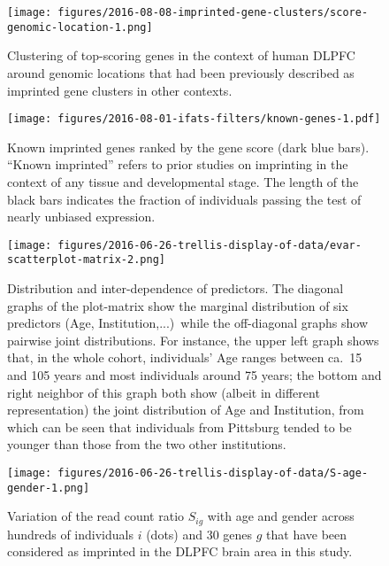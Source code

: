 \documentclass[letterpaper]{article}
\begin{document}

\setcounter{figure}{0}
\makeatletter 
\renewcommand{\thefigure}{S\@arabic\c@figure}
\makeatother

\begin{figure}[h]
\begin{center}
\texttt{[image: figures/2016-08-08-imprinted-gene-clusters/score-genomic-location-1.png]}
\end{center}
\caption{
Clustering of top-scoring genes in the context of human DLPFC around genomic locations that
had been previously described as imprinted gene clusters in other contexts.
}
\label{fig:clusters}
\end{figure}

\begin{figure}[h]
\begin{center}
\texttt{[image: figures/2016-08-01-ifats-filters/known-genes-1.pdf]}
\caption{Known imprinted genes ranked by the gene score (dark blue bars).
``Known imprinted'' refers to prior studies on imprinting in the context of
any tissue and developmental stage.  The length of the
black bars indicates the fraction of individuals passing the test of nearly
unbiased expression.}
\label{fig:known-genes}
\end{center}
\end{figure}

\begin{figure}[h]
\begin{center}
\texttt{[image: figures/2016-06-26-trellis-display-of-data/evar-scatterplot-matrix-2.png]}
\end{center}
\caption{
Distribution and inter-dependence of predictors.  The diagonal graphs of the
plot-matrix show the marginal distribution of six predictors (Age,
Institution,...)~while the off-diagonal graphs show pairwise joint
distributions.  For instance, the upper left graph shows that, in the whole
cohort, individuals' Age
ranges between ca.~15 and 105 years and most individuals around 75 years; the
bottom and right neighbor of this graph both show (albeit in different
representation) the joint distribution of Age and Institution, from which can
be seen that individuals from Pittsburg tended to be younger than those from
the two other institutions.
}
\label{fig:predictor-associations}
\end{figure}

\begin{figure}[h]
\begin{center}
\texttt{[image: figures/2016-06-26-trellis-display-of-data/S-age-gender-1.png]}
\caption{
Variation of the read count ratio \(S_{ig}\) with age and gender across hundreds of individuals
\(i\) (dots) and 30 genes \(g\) that have been considered as imprinted in the DLPFC
brain area in this study.
}
\label{fig:S-age-gender}
\end{center}
\end{figure}
\end{document}
